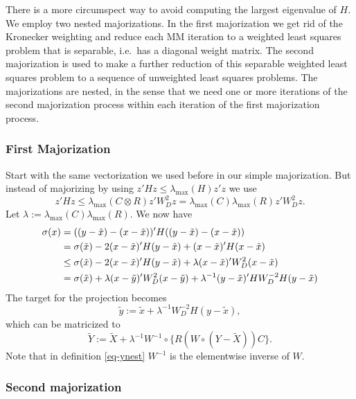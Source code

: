 \documentclass[
  12pt,
  letterpaper,
  DIV=11,
  numbers=noendperiod]{scrartcl}
\begin{document}
There is a more circumspect way to avoid computing the largest
eigenvalue of \(H\). We employ two nested majorizations. In the first
majorization we get rid of the Kronecker weighting and reduce each MM
iteration to a weighted least squares problem that is separable,
i.e.~has a diagonal weight matrix. The second majorization is used to
make a further reduction of this separable weighted least squares
problem to a sequence of unweighted least squares problems. The
majorizations are nested, in the sense that we need one or more
iterations of the second majorization process within each iteration of
the first majorization process.

\subsubsection{First Majorization}\label{first-majorization}

Start with the same vectorization we used before in our simple
majorization. But instead of majorizing by using
\(z'Hz\leq\lambda_{\text{max}}(H)z'z\) we use \begin{equation}
z'Hz\leq\lambda_{\text{max}}(C\otimes R)z'W_D^2z=\lambda_{\text{max}}(C)\lambda_{\text{max}}(R)z'W_D^2z.
\end{equation} Let
\(\lambda:=\lambda_{\text{max}}(C)\lambda_{\text{max}}(R)\). We now have
\begin{align}
\sigma(x)&=((y-\tilde x)-(x-\tilde x))'H((y-\tilde x)-(x-\tilde x))\notag\\
&=\sigma(\tilde x)-2(x-\tilde x)'H(y-\tilde x)+(x-\tilde x)'H(x-\tilde x)\notag\\
&\leq\sigma(\tilde x)-2(x-\tilde x)'H(y-\tilde x)+\lambda(x-\tilde x)'W_D^2(x-\tilde x)\notag\\
&=\sigma(\tilde x)+\lambda(x-\tilde y)'W_D^2(x-\tilde y)+\lambda^{-1}(y-\tilde x)'HW_D^{-2}H(y-\tilde x)
\end{align} The target for the projection becomes \begin{equation}
\tilde y:=\tilde x+\lambda^{-1}W_D^{-2}H(y-\tilde x),
\end{equation} which can be matricized to \begin{equation}
\tilde Y:=\tilde X+\lambda^{-1}W^{-1}\circ\{R(W\circ(Y-\tilde X))C\}.\label{eq-ynest}
\end{equation} Note that in definition \eqref{eq-ynest} \(W^{-1}\) is
the elementwise inverse of \(W\).

\subsubsection{Second majorization}\label{second-majorization}
\end{document}
